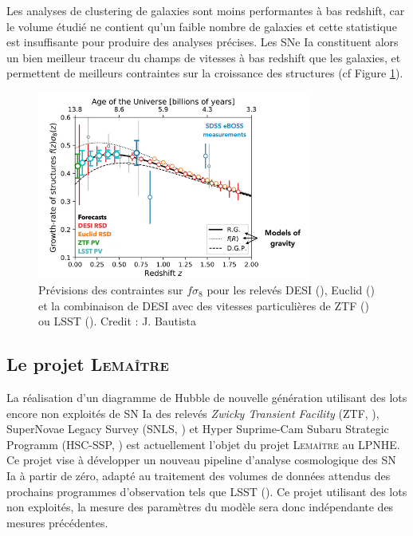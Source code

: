 \documentclass{book}
\def\lemaitre{\textsc{Lemaître}\xspace}
\begin{document}
Les analyses de clustering de galaxies sont moins performantes à bas redshift, car le volume étudié ne contient qu'un faible nombre de galaxies et cette statistique est insuffisante pour produire des analyses précises. Les SNe Ia constituent alors un bien meilleur traceur du champs de vitesses à bas redshift que les galaxies, et permettent de meilleurs contraintes sur la croissance des structures (cf Figure \ref{fig:fs8}).

\begin{figure}
    \centering
    \includegraphics[width=0.8\textwidth]{figures/fs8.png}
    \caption{Prévisions des contraintes sur $f\sigma_8$ pour les relevés DESI (\cite{hahn_desi_2023}), Euclid (\cite{euclid_collaboration_euclid_2024}) et la combinaison de DESI avec des vitesses particulières de ZTF (\cite{carreres_growth-rate_2023}) ou LSST (\cite{howlett_2mtf_2017}). Credit : J. Bautista}
    \label{fig:fs8}
\end{figure}

\subsection{Le projet \lemaitre}

 La réalisation d'un diagramme de Hubble de nouvelle génération utilisant des lots encore non exploités de SN Ia des relevés \textit{Zwicky Transient Facility} (ZTF, \cite{bellm_zwicky_2018}), SuperNovae Legacy Survey (SNLS, \cite{pritchet_snls_2004}) et Hyper Suprime-Cam Subaru Strategic Programm (HSC-SSP, \cite{miyazaki_hyper_2012,aihara_hyper_2018}) est actuellement l’objet du projet \lemaitre au LPNHE. Ce projet vise à développer un nouveau pipeline d'analyse cosmologique des SN Ia à partir de zéro, adapté au traitement des volumes de données attendus des prochains programmes d’observation tels que LSST (\cite{the_lsst_dark_energy_science_collaboration_lsst_2021}). Ce projet utilisant des lots non exploités, la mesure des paramètres du modèle sera donc indépendante des mesures précédentes.
\end{document}
